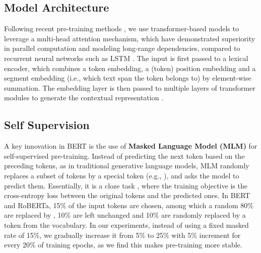 \documentclass[11pt,a4paper]{article}
\newcommand{\eat}[1]{\ignorespaces}
\begin{document}
\eat{
The model takes a sequence of sub-word tokens as inputs which contain two segments:  and  where n and m are the length of each segment respectively, sampled from a large-scale raw text corpus, e.g. Wikipedia.  In order to distinguish the boundary of these two segments, special tokens are added and it generates the final input sub-word tokens: .
}

\subsection{Model Architecture}
\label{subsec:bert}
Following recent pre-training methods \cite{devlin2018bert,liu2019roberta}, 
we use transformer-based models \cite{vaswani2017attention} 
to leverage a multi-head attention mechanism, which have demonstrated superiority in parallel computation and modeling long-range dependencies, compared to recurrent neural networks such as LSTM \cite{hochreiter1997lstm}. 
The input is first passed to a lexical encoder, which combines a token embedding, a (token) position embedding and a segment embedding (i.e., which text span the token belongs to) by element-wise summation. 
The embedding layer is then passed to multiple layers of transformer modules to generate the contextual representation \cite{vaswani2017attention}. 


\subsection{Self Supervision}
\label{subsec:pre-train-task}
A key innovation in BERT \cite{devlin2018bert} is the use of \textbf{Masked Language Model (MLM)} for self-supervised pre-training.
Instead of predicting the next token based on the preceding tokens, as in traditional generative language models, MLM randomly replaces a subset of tokens by a special token (e.g., ), and asks the model to predict them. 
Essentially, it is a cloze task \cite{taylor1953cloze}, where the training objective is the cross-entropy loss between the original tokens and the predicted ones. In BERT and RoBERTa, 15\% of the input tokens are chosen, among which a random 80\% are replaced by , 10\% are left unchanged and 10\% are randomly replaced by a token from the vocabulary. In our experiments, instead of using a fixed masked rate of 15\%, we gradually increase it from 5\% to 25\% with 5\% increment for every 20\% of training epochs, as we find this makes pre-training more stable.
\end{document}
